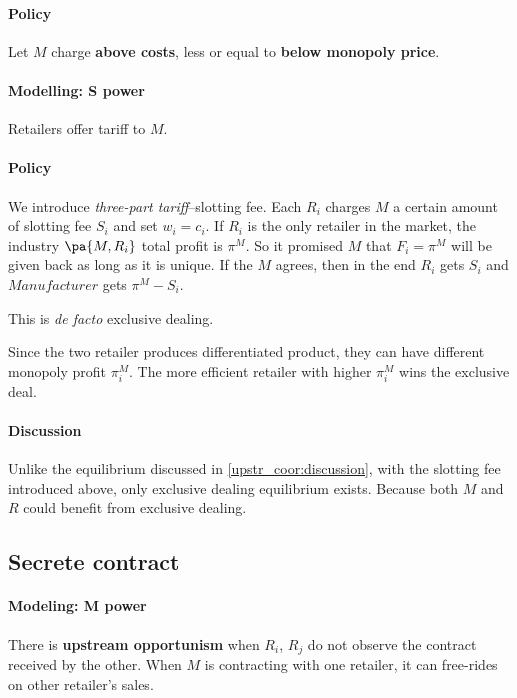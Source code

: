 \paragraph{Policy} Let $M$ charge \textbf{above costs}, less or equal to \textbf{below monopoly price}.

\paragraph{Modelling: S power}
Retailers offer tariff to $M$. 
\paragraph{Policy} We introduce \textit{three-part tariff}--slotting fee. Each $R_i$ charges $M$ a certain amount of slotting fee $S_i$ and set $w_i=c_i$. If $R_i$ is the only retailer in the market, the industry $\pa{M,R_i}$ total profit is $\pi^M$. So it promised $M$ that $F_i=\pi^M$ will be given back as long as it is unique. If the $M$ agrees, then in the end $R_i$ gets $S_i$ and $Manufacturer$ gets $\pi^M-S_i$.
\begin{remark}
    This is \emph{de facto} exclusive dealing.
\end{remark}
Since the two retailer produces differentiated product, they can have different monopoly profit $\pi_i^M$. The more efficient retailer with higher $\pi_i^M$ wins the exclusive deal. 
\paragraph{Discussion}
Unlike the equilibrium discussed in \ref{upstr_coor:discussion}, with the slotting fee introduced above, only exclusive dealing equilibrium exists. Because both $M$ and $R$ could benefit from exclusive dealing.

\subsection*{Secrete contract}
\paragraph{Modeling: M power} 
There is \textbf{upstream opportunism} when $R_i$, $R_j$ do not observe the contract received by the other. When $M$ is contracting with one retailer, it can free-rides on other retailer’s sales.
